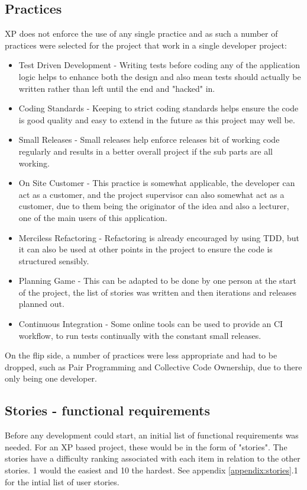 \subsection{Practices}
XP does not enforce the use of any single practice and as such a number of practices were selected for the project that work in a single developer project:
\begin{itemize}
	\item Test Driven Development - Writing tests before coding any of the application logic helps to enhance both the design and also mean tests should actually be written rather than left until the end and "hacked" in.
	\item Coding Standards - Keeping to strict coding standards helps ensure the code is good quality and easy to extend in the future as this project may well be.
	\item Small Releases - Small releases help enforce releases bit of working code regularly and results in a better overall project if the sub parts are all working.
	\item On Site Customer - This practice is somewhat applicable, the developer can act as a customer, and the project supervisor can also somewhat act as a customer, due to them being the originator of the idea and also a lecturer, one of the main users of this application.
	\item Merciless Refactoring - Refactoring is already encouraged by using TDD, but it can also be used at other points in the project to ensure the code is structured sensibly.
	\item Planning Game - This can be adapted to be done by one person at the start of the project, the list of stories was written and then iterations and releases planned out.
	\item Continuous Integration - Some online tools can be used to provide an CI workflow, to run tests continually with the constant small releases.
\end{itemize}

On the flip side, a number of practices were less appropriate and had to be dropped, such as Pair Programming and Collective Code Ownership, due to there only being one developer.

\subsection{Stories - functional requirements}
Before any development could start, an initial list of functional requirements was needed. For an XP based project, these would be in the form of "stories". The stories have a difficulty ranking associated with each item in relation to the other stories. 1 would the easiest and 10 the hardest. See appendix \ref{appendix:stories}.1 for the intial list of user stories.


